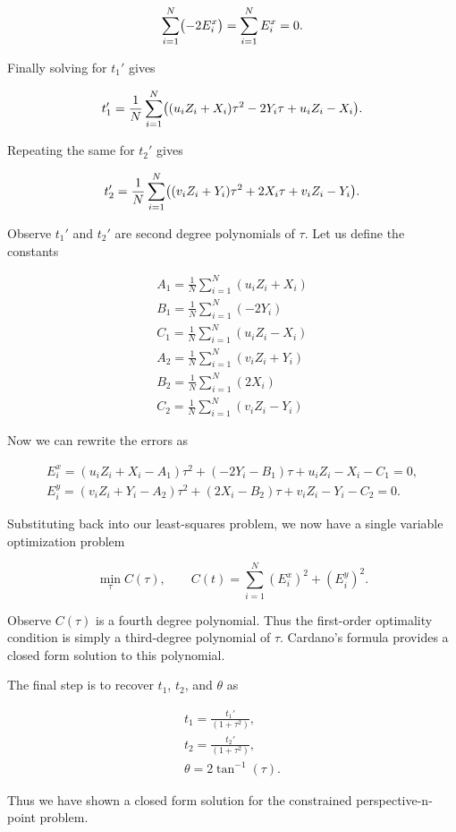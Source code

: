 \documentclass[12pt]{article}
\newcommand{\parens}[1]{\mathopen{}\left( {#1}_{{}_{}}\,\negthickspace\right)\mathclose{}}
\begin{document}
\begin{equation}
  \sum_{i=1}^N\parens{-2E_i^x}= \sum_{i=1}^NE_i^x=0.
\end{equation}

Finally solving for $t_1'$ gives

\begin{equation}
  t_1'=\frac{1}{N}\sum_{i=1}^N\parens{(u_iZ_i+X_i)\tau^2-2Y_i\tau+u_iZ_i-X_i}.
\end{equation}

Repeating the same for $t_2'$ gives

\begin{equation}
  t_2'=\frac{1}{N}\sum_{i=1}^N\parens{(v_iZ_i+Y_i)\tau^2+2X_i\tau+v_iZ_i-Y_i}.
\end{equation}

Observe $t_1'$ and $t_2'$ are second degree polynomials of $\tau$. Let us define the constants

\begin{align}
  A_1=\frac{1}{N}\sum_{i=1}^N (u_iZ_i+X_i)\\
  B_1=\frac{1}{N}\sum_{i=1}^N (-2Y_i)\\
  C_1=\frac{1}{N}\sum_{i=1}^N (u_iZ_i-X_i)\\
  A_2=\frac{1}{N}\sum_{i=1}^N (v_iZ_i+Y_i)\\
  B_2=\frac{1}{N}\sum_{i=1}^N (2X_i)\\
  C_2=\frac{1}{N}\sum_{i=1}^N (v_i Z_i-Y_i)
\end{align}

Now we can rewrite the errors as

\begin{align}
  E_i^x=(u_iZ_i+X_i-A_1)\tau^2+(-2Y_i-B_1)\tau+u_iZ_i-X_i-C_1=0,\\
  E_i^y=(v_iZ_i+Y_i-A_2)\tau^2+(2X_i-B_2)\tau+v_iZ_i-Y_i-C_2=0.
\end{align}

Substituting back into our least-squares problem, we now have a single variable optimization problem 

\begin{equation}
  \min_{\tau}C(\tau),\qquad C(t)=\sum_{i=1}^N(E_i^x)^2+(E_i^y)^2.
\end{equation}

Observe $C(\tau)$ is a fourth degree polynomial. Thus the first-order optimality condition is simply a third-degree polynomial of $\tau$. Cardano's formula provides a closed form solution to this polynomial.

The final step is to recover $t_1$, $t_2$, and $\theta$ as

\begin{align}
  t_1=\frac{t_1'}{(1+\tau^2)},\\
  t_2=\frac{t_2'}{(1+\tau^2)},\\
  \theta=2\tan^{-1}(\tau).
\end{align}

Thus we have shown a closed form solution for the constrained perspective-n-point problem.

\newpage 



\end{document}
